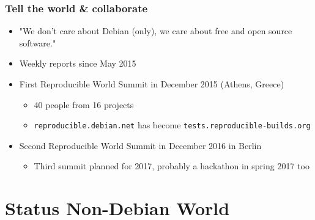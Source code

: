 \documentclass[14pt]{beamer}
\newif\ifplacelogo
\begin{document}
\begin{frame}
 \frametitle{Tell the world \& collaborate}

 \begin{itemize}
  \item "We don't care about Debian (only), we care about free and open
   source software."
  \item<2-4> Weekly reports since May 2015
  \item<3-4> First Reproducible World Summit in December 2015 (Athens, Greece)
   \begin{itemize}
    \item<3-4> 40 people from 16 projects
    \item<3-4> \texttt{reproducible.debian.net} has become \texttt{tests.reproducible-builds.org}
   \end{itemize}
    \item<3-4> Second Reproducible World Summit in December 2016 in Berlin
   \begin{itemize}
    \item<4> Third summit planned for 2017, probably a hackathon in spring
    2017 too
   \end{itemize}
 \end{itemize}
\end{frame}



\section{Status Non-Debian World}

\placelogofalse
\end{document}
